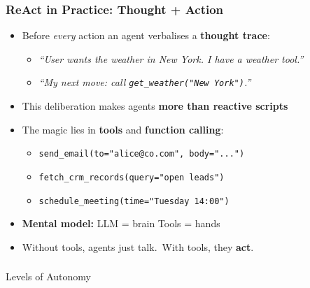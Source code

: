 \begin{frame}[fragile]\frametitle{ReAct in Practice: Thought + Action}
      \begin{itemize}
        \item Before \emph{every} action an agent verbalises a \textbf{thought trace}:
            \begin{itemize}
                \item \emph{``User wants the weather in New York. I have a weather tool.''}
                \item \emph{``My next move: call \texttt{get\_weather("New York")}.''}
            \end{itemize}
        \item This deliberation makes agents \textbf{more than reactive scripts}
        \item The magic lies in \textbf{tools} and \textbf{function calling}:
            \begin{itemize}
                \item \texttt{send\_email(to="alice@co.com", body="...")}
                \item \texttt{fetch\_crm\_records(query="open leads")}
                \item \texttt{schedule\_meeting(time="Tuesday 14:00")}
            \end{itemize}
        \item \textbf{Mental model:} LLM = brain \quad Tools = hands
        \item Without tools, agents just talk.\ With tools, they \textbf{act}.
      \end{itemize}
\end{frame}

\begin{frame}[fragile]\frametitle{}
\begin{center}
{\Large Levels of Autonomy}
\end{center}
\end{frame}


